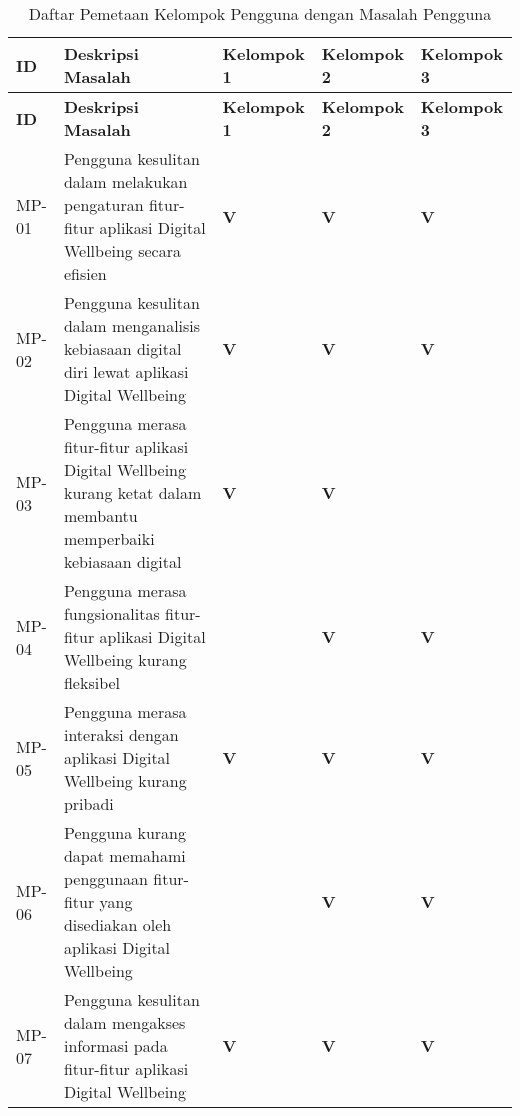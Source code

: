 \RaggedLeft
\begin{small}
\begin{longtable}[c]{|>{\ccnormspacing}m{}|>{\ccnormspacing}m{}|>{\ccnormspacingcenter}m{}|>{\ccnormspacingcenter}m{}|>{\ccnormspacingcenter}m{}|}
  \caption{Daftar Pemetaan Kelompok Pengguna dengan Masalah Pengguna}
  \label{tab:pemetaan_masalah} \\
  \hline \rowcolor[HTML]{A3E5F5}
  \centering\textbf{ID} & \centering\textbf{Deskripsi Masalah} & \textbf{Kelompok 1} & \textbf{Kelompok 2} & \textbf{Kelompok 3} \\ \hline \endfirsthead
  \hline \rowcolor[HTML]{A3E5F5}
  \centering\textbf{ID} & \centering\textbf{Deskripsi Masalah} & \textbf{Kelompok 1} & \textbf{Kelompok 2} & \textbf{Kelompok 3} \\ \hline \endhead

  \hline \endfoot

  \centering MP-01 & Pengguna kesulitan dalam melakukan pengaturan fitur-fitur aplikasi Digital Wellbeing secara efisien & \textbf{V} & \textbf{V} & \textbf{V} \\ \hline
  \centering MP-02 & Pengguna kesulitan dalam menganalisis kebiasaan digital diri lewat aplikasi Digital Wellbeing & \textbf{V} & \textbf{V} & \textbf{V} \\ \hline
  \centering MP-03 & Pengguna merasa fitur-fitur aplikasi Digital Wellbeing kurang ketat dalam membantu memperbaiki kebiasaan digital & \textbf{V} & \textbf{V} &  \\ \hline
  \centering MP-04 & Pengguna merasa fungsionalitas fitur-fitur aplikasi Digital Wellbeing kurang fleksibel &  & \textbf{V} & \textbf{V} \\ \hline
  \centering MP-05 & Pengguna merasa interaksi dengan aplikasi Digital Wellbeing kurang pribadi & \textbf{V} & \textbf{V} & \textbf{V} \\ \hline
  \centering MP-06 & Pengguna kurang dapat memahami penggunaan fitur-fitur yang disediakan oleh aplikasi Digital Wellbeing &  & \textbf{V} & \textbf{V} \\ \hline
  \centering MP-07 & Pengguna kesulitan dalam mengakses informasi pada fitur-fitur aplikasi Digital Wellbeing & \textbf{V} & \textbf{V} & \textbf{V} \\ \hline

\end{longtable}
\end{small}
\justifying
\FloatBarrier

